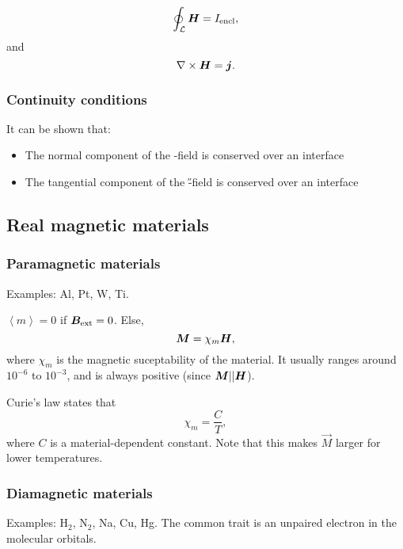     \begin{equation}
        \oint_\mathcal{L}\bm{H} = I_{\text{encl}},
    \end{equation}
    and 
    \begin{equation}
        \nabla\times\bm{H} = \bm{j}.
    \end{equation}
    
    \subsubsection{Continuity conditions}
        It can be shown that:
        \begin{itemize}
            \item The normal component of the \B-field is conserved over an interface
            \item The tangential component of the \H-field is conserved over an interface
        \end{itemize}

\subsection{Real magnetic materials}
    \subsubsection{Paramagnetic materials}
        Examples: Al, Pt, W, Ti.

        $\left<m\right>=0$ if $\bm{B}_{\text{ext}} = 0$. Else, 
        \begin{equation}
            \bm{M} = \chi_m\bm{H},
        \end{equation}
        where $\chi_m$ is the magnetic suceptability of the material. 
        It usually ranges around $10^{-6}$ to $10^{-3}$, and is always positive (since $\bm{M} || \bm{H}$).

        Curie's law states that 
        \begin{equation}
            \chi_m = \frac{C}{T}, 
        \end{equation}
        where $C$ is a material-dependent constant. Note that this makes $\vec{M}$ larger for lower temperatures.

    \subsubsection{Diamagnetic materials}
        Examples: $\text{H}_2$, $\text{N}_2$, Na, Cu, Hg. The common trait is an unpaired electron in the molecular orbitals.
        
